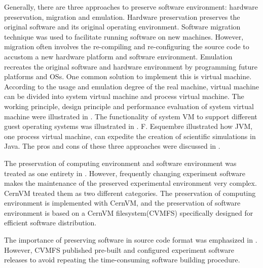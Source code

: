 \documentclass{sig-alternate}
\begin{document}
Generally, there are three approaches to preserve software environment:
hardware preservation, migration and emulation.  Hardware
preservation preserves the original software and its original operating
environment. 
Software migration technique \cite{cifuentes1996binary,mancl2001refactoring} was used to facilitate running software on new machines.
However, migration often involves the re-compiling and re-configuring
the source code to accustom a new hardware platform and software environment.
Emulation recreates the original software and hardware environment by
programming future platforms and OSs. One common solution to implement this is
virtual machine. According to the usage and emulation degree of the real
machine, virtual machine can be divided into system virtual machine and process
virtual machine. 
The working principle, design principle and
performance evaluation of system virtual machine were illustrated in \cite{goldberg1974survey, smith2005architecture}. 
The
functionality of system VM to support different guest operating systems was illustrated in \cite{barham2003xen,kivity2007kvm,rosenblum1999vmware}.
F. Esquembre \cite{esquembre2004easy} illustrated how JVM, one process virtual machine, can expedite the creation of
scientific simulations in Java. 
The pros and cons of these three approaches were discussed in \cite{matthews2009towards,phelps2005no,hong2010software}.

The preservation of computing environment and software environment was treated as one entirety in \cite{matthews2009towards,phelps2005no,hong2010software}. However, frequently changing experiment software makes the maintenance of the preserved experimental environment very complex. 
CernVM \cite{buncic2010cernvm} treated them as two different categories. The preservation of computing environment is implemented with CernVM, and the preservation of software environment is based on a CernVM filesystem(CVMFS) specifically designed for efficient software distribution.

The importance of preserving software in source code format was emphasized in \cite{zabolitzky2002preserving,castagne2013consider}. 
However, CVMFS \cite{buncic2010cernvm} published pre-built and configured experiment software releases to avoid repeating the time-consuming software building procedure. 
\end{document}
